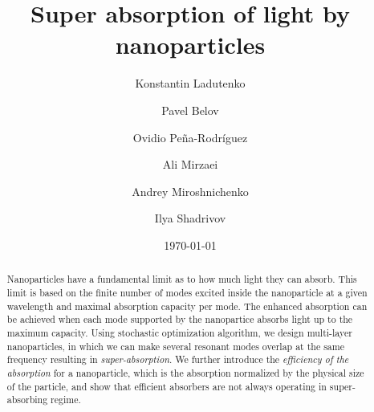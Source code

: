 \documentclass[aps,prl,twocolumn,showpacs,superscriptaddress,groupedaddress]{revtex4-1}
\begin{document}

\title{Super absorption of light by nanoparticles} %

\author{Konstantin Ladutenko} 


\author{Pavel Belov} 

\author{Ovidio Pe\~{n}a-Rodr\'{i}guez} 

\author{Ali Mirzaei} \author{Andrey Miroshnichenko} \author{Ilya
  Shadrivov} 

\date{\today}

\begin{abstract}
  Nanoparticles have a fundamental limit as to how much light they can
  absorb. This limit is based on the finite number of modes excited
  inside the nanoparticle at a given wavelength and maximal absorption
  capacity per mode. The enhanced absorption can be achieved
  when each mode supported by the nanopartice absorbs light up to the
  maximum capacity. Using stochastic optimization algorithm, we design
  multi-layer nanoparticles, in which we can make several resonant
  modes overlap at the same frequency resulting in {\it
    super-absorption}.  We further introduce the {\it efficiency of
    the absorption} for a nanoparticle, which is the absorption normalized
  by the physical size of the particle, and show that efficient
  absorbers are not always operating in super-absorbing regime.
\end{abstract}
\end{document}
